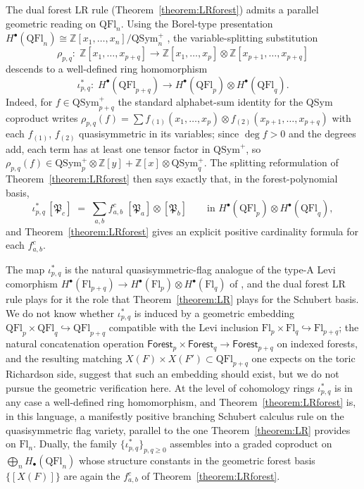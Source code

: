 \documentclass{amsart}
\theoremstyle{definition}
\theoremstyle{remark}
\numberwithin{equation}{subsection}
\newcommand{\forest}{\mathfrak{P}}
\begin{document}
The dual forest LR rule (Theorem~\ref{theorem:LRforest}) admits a parallel geometric reading on $\mathrm{QFl}_n$. Using the Borel-type presentation $H^\bullet(\mathrm{QFl}_n)\cong \mathbb{Z}[x_1,\ldots,x_n]/\mathrm{QSym}_n^+$ \cite[Theorem~A and Corollary~12.5]{bergeron2025qsymflag}, the variable-splitting substitution
$$\rho_{p,q}:\;\mathbb{Z}[x_1,\ldots,x_{p+q}]\longrightarrow \mathbb{Z}[x_1,\ldots,x_p]\otimes \mathbb{Z}[x_{p+1},\ldots,x_{p+q}]$$
descends to a well-defined ring homomorphism
$$\iota_{p,q}^*:\;H^\bullet(\mathrm{QFl}_{p+q})\longrightarrow H^\bullet(\mathrm{QFl}_p)\otimes H^\bullet(\mathrm{QFl}_q).$$
Indeed, for $f\in\mathrm{QSym}_{p+q}^+$ the standard alphabet-sum identity for the QSym coproduct writes $\rho_{p,q}(f) = \sum f_{(1)}(x_1,\ldots,x_p)\otimes f_{(2)}(x_{p+1},\ldots,x_{p+q})$ with each $f_{(1)}$, $f_{(2)}$ quasisymmetric in its variables; since $\deg f>0$ and the degrees add, each term has at least one tensor factor in $\mathrm{QSym}^+$, so $\rho_{p,q}(f)\in \mathrm{QSym}_p^+\otimes\mathbb{Z}[y] + \mathbb{Z}[x]\otimes \mathrm{QSym}_q^+$. The splitting reformulation of Theorem~\ref{theorem:LRforest} then says exactly that, in the forest-polynomial basis,
$$\iota_{p,q}^*\,[\forest_c] \;=\; \sum_{a,b} f_{a,b}^c\;[\forest_a]\otimes [\forest_b]\qquad\text{in } H^\bullet(\mathrm{QFl}_p)\otimes H^\bullet(\mathrm{QFl}_q),$$
and Theorem~\ref{theorem:LRforest} gives an explicit positive cardinality formula for each $f_{a,b}^c$.

The map $\iota_{p,q}^*$ is the natural quasisymmetric-flag analogue of the type-A Levi comorphism $H^\bullet(\mathrm{Fl}_{p+q})\to H^\bullet(\mathrm{Fl}_p)\otimes H^\bullet(\mathrm{Fl}_q)$ of \cite{ressayre2009branching}, and the dual forest LR rule plays for it the role that Theorem~\ref{theorem:LR} plays for the Schubert basis. We do not know whether $\iota_{p,q}^*$ is induced by a geometric embedding $\mathrm{QFl}_p\times \mathrm{QFl}_q\hookrightarrow \mathrm{QFl}_{p+q}$ compatible with the Levi inclusion $\mathrm{Fl}_p\times \mathrm{Fl}_q\hookrightarrow \mathrm{Fl}_{p+q}$; the natural concatenation operation $\mathsf{Forest}_p\times \mathsf{Forest}_q\to \mathsf{Forest}_{p+q}$ on indexed forests, and the resulting matching $X(F)\times X(F')\subset \mathrm{QFl}_{p+q}$ one expects on the toric Richardson side, suggest that such an embedding should exist, but we do not pursue the geometric verification here. At the level of cohomology rings $\iota_{p,q}^*$ is in any case a well-defined ring homomorphism, and Theorem~\ref{theorem:LRforest} is, in this language, a manifestly positive branching Schubert calculus rule on the quasisymmetric flag variety, parallel to the one Theorem~\ref{theorem:LR} provides on $\mathrm{Fl}_n$. Dually, the family $\{\iota_{p,q}^*\}_{p,q\geq 0}$ assembles into a graded coproduct on $\bigoplus_n H_\bullet(\mathrm{QFl}_n)$ whose structure constants in the geometric forest basis $\{[X(F)]\}$ are again the $f_{a,b}^c$ of Theorem~\ref{theorem:LRforest}.
\end{document}
